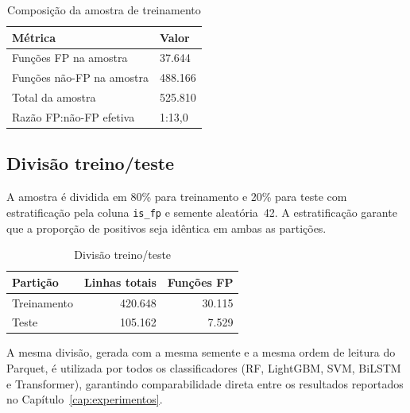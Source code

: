 \begin{table}[htb]
\centering
\caption{Composição da amostra de treinamento}
\label{tab:amostra}
\begin{tabular}{ll}
\toprule
\textbf{Métrica} & \textbf{Valor} \\
\midrule
Funções FP na amostra    &  37.644 \\
Funções não-FP na amostra & 488.166 \\
Total da amostra         & 525.810 \\
Razão FP:não-FP efetiva  & 1:13,0 \\
\bottomrule
\end{tabular}

\end{table}

\subsection{Divisão treino/teste}
\label{sub:split}

A amostra é dividida em 80\% para treinamento e 20\% para teste com estratificação
pela coluna \texttt{is\_fp} e semente aleatória~42. A estratificação garante que a
proporção de positivos seja idêntica em ambas as partições.

\begin{table}[htb]
\centering
\caption{Divisão treino/teste}
\label{tab:split}
\begin{tabular}{lrr}
\toprule
\textbf{Partição} & \textbf{Linhas totais} & \textbf{Funções FP} \\
\midrule
Treinamento & 420.648 & 30.115 \\
Teste       & 105.162 &  7.529 \\
\bottomrule
\end{tabular}

\end{table}

A mesma divisão, gerada com a mesma semente e a mesma ordem de leitura do
Parquet, é utilizada por todos os classificadores (RF, LightGBM, SVM, BiLSTM e
Transformer), garantindo comparabilidade direta entre os resultados reportados no
Capítulo~\ref{cap:experimentos}.
